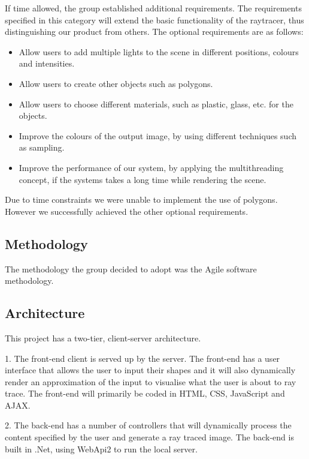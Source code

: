 \documentclass[a4paper]{article}
\begin{document}
	If time allowed, the group established additional requirements.
	The requirements specified in this category will extend the basic functionality of the raytracer, thus distinguishing our product from others. The optional requirements are as follows:
	\begin{itemize}
		\item Allow users to add multiple lights to the scene in different positions, colours and intensities.
		\item Allow users to create other objects such as polygons.
		\item Allow users to choose different materials, such as plastic, glass, etc. for the objects.
		\item Improve the colours of the output image, by using different techniques such as sampling.
		\item Improve the performance of our system, by applying the multithreading concept, if the systems takes a long time while rendering the scene.
	\end{itemize}
	
	Due to time constraints we were unable to implement the use of polygons. However we successfully achieved the other optional requirements. 
	
	
	\subsection{Methodology}
	
	The methodology the group decided to adopt was the Agile software methodology. 
	
	\subsection{Architecture}
	
	
	This project has a two-tier, client-server architecture.
	
	1.  The front-end client is served up by the server.  The front-end has a user interface that allows the user to input their shapes and it will also dynamically render an approximation of the input to visualise what the user is about to ray trace.  The front-end will primarily be coded in HTML, CSS, JavaScript and AJAX.
	
	2.   The  back-end  has  a  number  of  controllers  that  will  dynamically  process  the content specified by the user and generate a ray traced image.  The back-end is built in .Net, using WebApi2 to run the local server.
	
\end{document}
